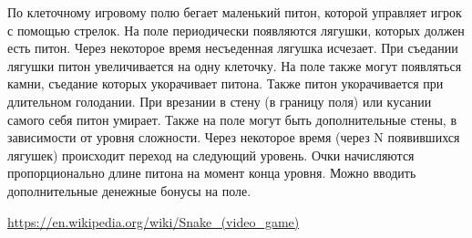 \begin{zztask}[Snake, 1976]
По клеточному игровому полю бегает маленький питон, которой управляет игрок с
помощью стрелок. На поле периодически появляются лягушки, которых должен есть
питон. Через некоторое время несъеденная лягушка исчезает. При съедании
лягушки питон увеличивается на одну клеточку. На поле также могут появляться
камни, съедание которых укорачивает питона. Также питон укорачивается при
длительном голодании. При врезании в стену (в границу поля) или кусании самого
себя питон умирает. Также на поле могут быть дополнительные стены, в
зависимости от уровня сложности. Через некоторое время (через N появившихся
лягушек) происходит переход на следующий уровень. Очки начисляются
пропорционально длине питона на момент конца уровня. Можно вводить
дополнительные денежные бонусы на поле.
\begin{flushright}
	\url{https://en.wikipedia.org/wiki/Snake_(video_game)}
\end{flushright}
\end{zztask}

